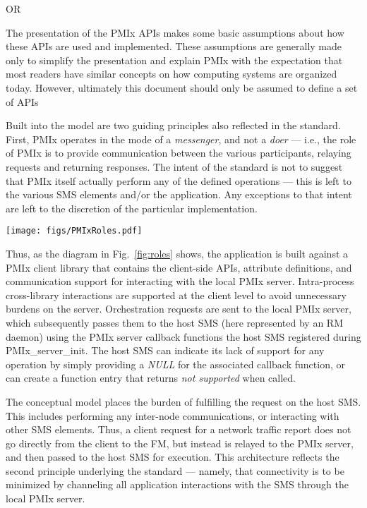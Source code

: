 OR

The presentation of the \ac{PMIx} APIs makes some basic assumptions about how these APIs
are used and implemented.  These assumptions are generally made only to simplify 
the presentation and explain \ac{PMIx} with the expectation that most readers 
have similar concepts on how computing systems are organized today.  However, ultimately
this document should only be assumed to define a set of APIs 


Built into the model are two guiding principles also reflected in the standard. First,
\ac{PMIx} operates in the mode of a \textit{messenger}, and not a \textit{doer} --- i.e., the role
of \ac{PMIx} is to provide communication between the various participants, relaying requests and returning
responses. The intent of the standard is not to suggest that \ac{PMIx} itself actually perform any of
the defined operations --- this is left to the various \ac{SMS} elements and/or the application. Any exceptions to that intent are left to the discretion of the particular implementation.


\begingroup
\begin{figure*}[ht!]
  \begin{center}
    \texttt{[image: figs/PMIxRoles.pdf]}
  \end{center}
  \caption{PMIx-SMS Interactions}
  \label{fig:roles}
\end{figure*}
\endgroup


Thus, as the diagram in Fig.~\ref{fig:roles} shows, the application is built against a \ac{PMIx} client library that contains the client-side \acp{API},
attribute definitions, and communication support for interacting with the local \ac{PMIx} server. Intra-process cross-library interactions
are supported at the client level to avoid unnecessary burdens on the server. Orchestration requests are sent to the
local \ac{PMIx} server, which subsequently passes them to the host \ac{SMS} (here represented by an \ac{RM} daemon) using the \ac{PMIx} server callback functions the host \ac{SMS} registered during PMIx\_server\_init. The host \ac{SMS} can indicate its lack of support for any operation by simply providing a \textit{NULL} for the associated callback function, or can create a function entry that returns \textit{not supported} when called.

The conceptual model places the burden of fulfilling the request on the host \ac{SMS}. This includes performing any
inter-node communications, or interacting with other \ac{SMS} elements. Thus, a client request for a network traffic report
does not go directly from the client to the \ac{FM}, but instead is relayed to the \ac{PMIx} server, and then passed to the host \ac{SMS}
for execution. This architecture reflects the second principle underlying the standard --- namely, that connectivity is to be minimized by channeling all application interactions with the \ac{SMS} through the local \ac{PMIx} server.

